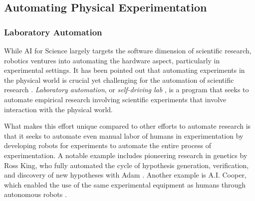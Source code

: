 \documentclass{article}
\begin{document}


\subsection{Automating Physical Experimentation}

\subsubsection{Laboratory Automation}
While AI for Science largely targets the software dimension of scientific research, robotics ventures into automating the hardware aspect, particularly in experimental settings. It has been pointed out that automating experiments in the physical world is crucial yet challenging for the automation of scientific research \cite{coley2020autonomous,zenil2023}. 
 \textit{Laboratory automation}, or \textit{self-driving lab} \cite{abolhasani2023rise}, is a program that seeks to automate empirical research involving scientific experiments that involve interaction with the physical world.

What makes this effort unique compared to other efforts to automate research is that it seeks to automate even manual labor of humans in experimentation by developing robots for experiments to automate the entire process of experimentation. A notable example includes pioneering research in genetics by Ross King, who fully automated the cycle of hypothesis generation, verification, and discovery of new hypotheses with Adam \cite{king2004functional}. Another example is A.I. Cooper, which enabled the use of the same experimental equipment as humans through autonomous robots \cite{burger2020mobile}. 
\end{document}
